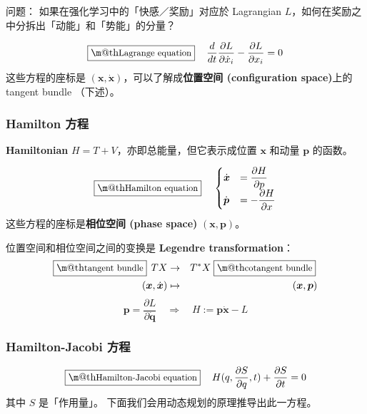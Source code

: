\documentclass[orivec]{llncs}
\makeatletter
\newcommand{\emp}[1]{\textbf{\textcolor{Cerulean}{#1}}}
\newcommand{\vect}[1]{\boldsymbol{#1}}
\renewcommand{\boxed}[1]{\fbox{\m@th$\displaystyle\scalebox{0.9}{#1}$} \,}
\makeatother
\begin{document}
问题： 如果在强化学习中的「快感／奖励」对应於 Lagrangian $L$，如何在奖励之中分拆出「动能」和「势能」的分量？ 

\begin{equation}
\boxed{\mbox{Lagrange equation}} \quad
\frac{d}{dt} \frac{\partial L}{\partial \dot{x}_i} - \frac{\partial L}{\partial x_i} = 0
\end{equation}
这些方程的座标是 $(\vect{x}, \dot{\vect{x}})$，可以了解成\emp{位置空间 (configuration space)}上的 tangent bundle （下述）。

\subsubsection{Hamilton 方程}

\emp{Hamiltonian} $H = T + V$，亦即总能量，但它表示成位置 $\vect{x}$ 和动量 $\vect{p}$ 的函数。

\begin{equation}
\label{Hamilton-eqns}
  \boxed{\mbox{Hamilton equation}} \quad
  \begin{cases}
      \dot{\vect{x}} & = \displaystyle \frac{\partial H}{\partial p} \\
      \dot{\vect{p}} & = - \displaystyle \frac{\partial H}{\partial x}
  \end{cases}
\end{equation}
这些方程的座标是\emp{相位空间 (phase space)} $(\vect{x}, \vect{p})$。

位置空间和相位空间之间的变换是 \emp{Legendre transformation}：
\begin{eqnarray}
\boxed{\mbox{tangent bundle}} \; T X & \rightarrow & T^* X \; \boxed{\mbox{cotangent bundle}} \\
(\vect{x}, \dot{\vect{x}}) & \mapsto & (\vect{x}, \vect{p})
\end{eqnarray}
\begin{equation}
\vect{p} = \frac{\partial L}{\partial \dot{\vect{q}}} \quad \Rightarrow \quad H := \vect{p} \dot{\vect{x}} - L
\end{equation}

\subsubsection{Hamilton-Jacobi 方程}

\begin{equation}
\boxed{\mbox{Hamilton-Jacobi equation}} \quad
H(q, \frac{\partial S}{\partial q}, t) + \frac{\partial S}{\partial t} = 0
\end{equation}
其中 $S$ 是「作用量」。 下面我们会用动态规划的原理推导出此一方程。
\end{document}
